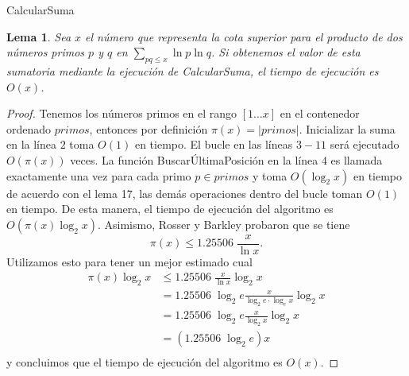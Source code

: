 \documentclass[10pt]{article}
\newtheorem{lemma}[theorem]{Lema}
\theoremstyle{definition}
\theoremstyle{remark}
\begin{document}
\begin{algorithm}[H]
\SetAlgoLined
\DontPrintSemicolon
{}
\caption{CalcularSuma\label{CS}}
\end{algorithm}

\begin{lemma}
Sea $x$ el n\'umero que representa la cota superior para el producto de dos n\'umeros primos
$p$ y $q$ en $\sum_{pq \leq x} \ln p \ln q$.
Si obtenemos el valor de esta sumatoria mediante la ejecuci\'on de CalcularSuma, 
el tiempo de ejecuci\'on es $O(x)$.
\end{lemma}

\begin{proof}
Tenemos los n\'umeros primos en el rango $[1 \dots x]$ en el contenedor ordenado $primos$,
entonces por definici\'on $\pi(x)=|primos| $.
Inicializar la suma en la l\'inea $2$ toma $O(1)$ en tiempo.
El bucle en las l\'ineas $3-11$ ser\'a ejecutado $O(\pi(x))$ veces.
La funci\'on Buscar\'UltimaPosici\'on en la l\'inea $4$ es llamada exactamente una vez para cada primo $p \in primos$ y
toma $O(\log_2 x)$ en tiempo de acuerdo con el lema 17, 
las dem\'as operaciones dentro del bucle toman $O(1)$ en tiempo.
De esta manera, el tiempo de ejecuci\'on del algoritmo es $O(\pi(x)\log_2 x)$.
Asimismo, Rosser y Barkley probaron que se tiene \cite[teorema 2 y corolario 1]{Chebyshev}
$$\pi(x) \leq 1.25506\;\frac{x}{\ln x}. %
$$
Utilizamos esto para tener un mejor estimado cual 
\begin{align*}
    \pi(x)\log_2 x &\leq 1.25506\;\frac{x}{\ln x} \log_2 x\\
    &= 1.25506\;\log_2 e \frac{x}{\log_2 e \cdot \log_e x} \log_2 x\\
    &= 1.25506\;\log_2 e \frac{x}{\log_2 x} \log_2 x\\
    &= (1.25506\;\log_2 e) x\\
\end{align*}
y concluimos que el tiempo de ejecuci\'on del algoritmo es $O(x)$.
\end{proof}
\end{document}
